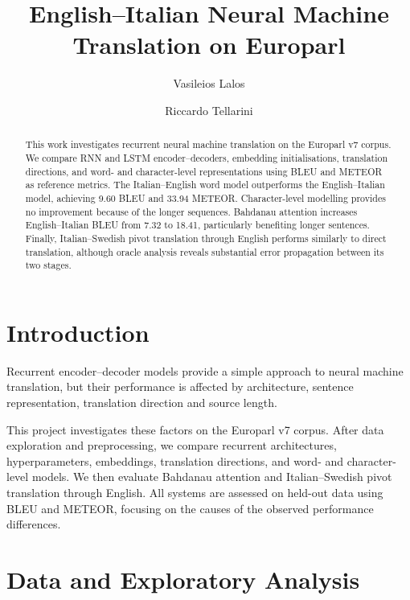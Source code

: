 \documentclass[sigconf,nonacm]{acmart}
\begin{document}
\title{English--Italian Neural Machine Translation on Europarl}

\author{Vasileios Lalos}
\affiliation{\institution{}\country{}}
\author{Riccardo Tellarini}
\affiliation{\institution{}\country{}}

\begin{abstract}
This work investigates recurrent neural machine translation on the Europarl v7 corpus. We compare RNN and LSTM encoder--decoders, embedding initialisations, translation directions, and word- and character-level representations using BLEU and METEOR as reference metrics. The Italian--English word model outperforms the English--Italian model, achieving 9.60 BLEU and 33.94 METEOR. Character-level modelling provides no improvement because of the longer sequences. Bahdanau attention increases English--Italian BLEU from 7.32 to 18.41, particularly benefiting longer sentences. Finally, Italian--Swedish pivot translation through English performs similarly to direct translation, although oracle analysis reveals substantial error propagation between its two stages.
\end{abstract}


\maketitle

\section{Introduction}

Recurrent encoder--decoder models provide a simple approach to neural machine translation, but their performance is affected by architecture, sentence representation, translation direction and source length.

This project investigates these factors on the Europarl v7 corpus. After data exploration and preprocessing, we compare recurrent architectures, hyperparameters, embeddings, translation directions, and word- and character-level models. We then evaluate Bahdanau attention and Italian--Swedish pivot translation through English. All systems are assessed on held-out data using BLEU and METEOR, focusing on the causes of the observed performance differences.

\section{Data and Exploratory Analysis}
\label{sec}
\end{document}
